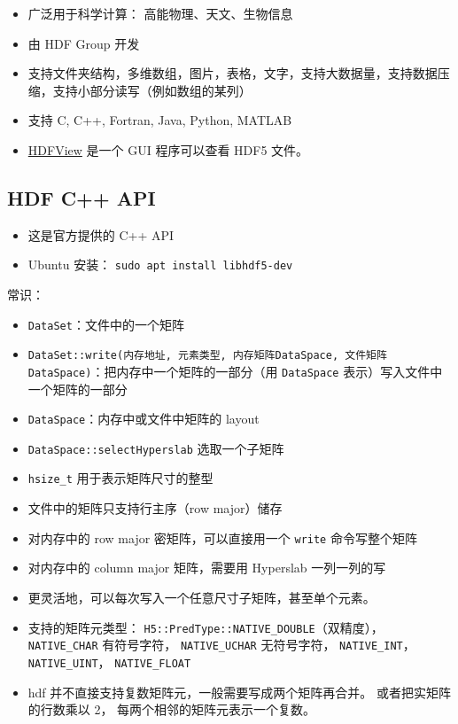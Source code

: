 

\begin{issues}
\issueDraft
\end{issues}

\begin{itemize}
\item 广泛用于科学计算： 高能物理、天文、生物信息
\item 由 HDF Group 开发
\item 支持文件夹结构，多维数组，图片，表格，文字，支持大数据量，支持数据压缩，支持小部分读写（例如数组的某列）
\item 支持 C, C++, Fortran, Java, Python, MATLAB
\item \href{https://www.hdfgroup.org/downloads/hdfview/}{HDFView} 是一个 GUI 程序可以查看 HDF5 文件。
\end{itemize}

\subsection{HDF C++ API}
\begin{itemize}
\item 这是官方提供的 C++ API
\item Ubuntu 安装： \verb|sudo apt install libhdf5-dev|
\end{itemize}

常识：
\begin{itemize}
\item \verb|DataSet|：文件中的一个矩阵
\item \verb|DataSet::write(内存地址, 元素类型, 内存矩阵DataSpace, 文件矩阵DataSpace)|：把内存中一个矩阵的一部分（用 \verb`DataSpace` 表示）写入文件中一个矩阵的一部分
\item \verb|DataSpace|：内存中或文件中矩阵的 layout
\item \verb|DataSpace::selectHyperslab| 选取一个子矩阵
\item \verb`hsize_t` 用于表示矩阵尺寸的整型
\item 文件中的矩阵只支持行主序（row major）储存
\item 对内存中的 row major 密矩阵，可以直接用一个 \verb`write` 命令写整个矩阵
\item 对内存中的 column major 矩阵，需要用 Hyperslab 一列一列的写
\item 更灵活地，可以每次写入一个任意尺寸子矩阵，甚至单个元素。
\item 支持的矩阵元类型： \verb`H5::PredType::NATIVE_DOUBLE`（双精度）， \verb`NATIVE_CHAR` 有符号字符， \verb`NATIVE_UCHAR` 无符号字符， \verb`NATIVE_INT`， \verb`NATIVE_UINT`， \verb`NATIVE_FLOAT`
\item hdf 并不直接支持复数矩阵元，一般需要写成两个矩阵再合并。 或者把实矩阵的行数乘以 2， 每两个相邻的矩阵元表示一个复数。
\end{itemize}


